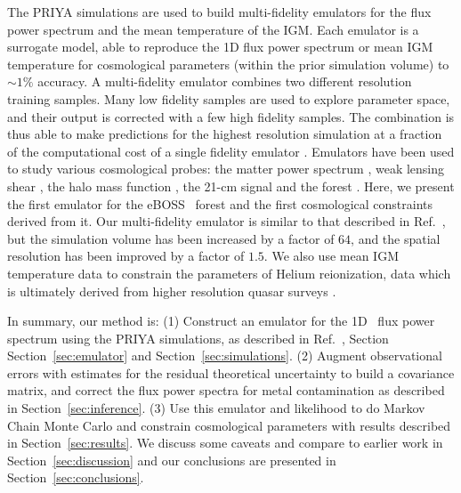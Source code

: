 The PRIYA simulations are used to build multi-fidelity emulators  \cite{2019JCAP...02..050B, 2022MNRAS.509.2551H, 2022MNRAS.517.3200F} for the flux power spectrum and the mean temperature of the IGM. Each emulator is a surrogate model, able to reproduce the 1D flux power spectrum or mean IGM temperature for cosmological parameters (within the prior simulation volume) to $\sim 1 \%$ accuracy. A multi-fidelity emulator combines two different resolution training samples. Many low fidelity samples are used to explore parameter space, and their output is corrected with a few high fidelity samples. The combination is thus able to make predictions for the highest resolution simulation at a fraction of the computational cost of a single fidelity emulator \cite{10.1093/biomet/87.1.1, 2022MNRAS.509.2551H}. Emulators have been used to study various cosmological probes: the matter power spectrum \citep{Heitmann:2009, Heitmann:2014, Lawrence:2017, Giblin:2019, Euclid:2021, Arico:2021, Giri:2021}, weak lensing shear \citep{Harnois:2019, Davies:2021}, the halo mass function \citep{McClintock:2019, Nishimichi:2019, Bocquet:2022}, the 21-cm signal \citep{Kern:2017, Cohen:2020, Bevins:2021, Bye:2022} and the \lya forest \citep{2019JCAP...02..050B, Rogers:2019, 2021JCAP...05..033P, 2021JCAP...04..059W, Rogers:2021a,2021PhRvL.126g1302R}. Here, we present the first emulator for the eBOSS \lya~forest and the first cosmological constraints derived from it. Our multi-fidelity emulator is similar to that described in Ref.~\cite{2022MNRAS.517.3200F}, but the simulation volume has been increased by a factor of $64$, and the spatial resolution has been improved by a factor of $1.5$. We also use mean IGM temperature data \cite{2021MNRAS.506.4389G} to constrain the parameters of Helium reionization, data which is ultimately derived from higher resolution quasar surveys \citep{2017MNRAS.466.4332I, 2022MNRAS.509.2842K, 2019MNRAS.489.2536D}.


In summary, our method is: (1) Construct an emulator for the 1D \lya~flux power spectrum using the PRIYA simulations, as described in Ref.~\cite{2023simsuite}, Section Section~\ref{sec:emulator} and Section~\ref{sec:simulations}. (2) Augment observational errors with estimates for the residual theoretical uncertainty to build a covariance matrix, and correct the flux power spectra for metal contamination as described in Section~\ref{sec:inference}. (3) Use this emulator and likelihood to do Markov Chain Monte Carlo and constrain cosmological parameters with results described in Section~\ref{sec:results}. We discuss some caveats and compare to earlier work in Section~\ref{sec:discussion} and our conclusions are presented in Section~\ref{sec:conclusions}.

